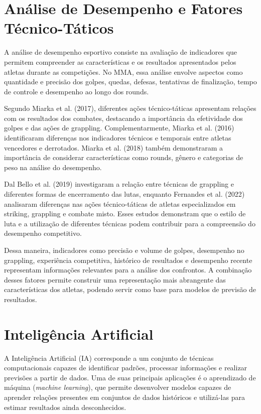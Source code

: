 \documentclass[12pt,a4paper]{report}
\begin{document}
\section{Análise de Desempenho e Fatores Técnico-Táticos}

A análise de desempenho esportivo consiste na avaliação de indicadores que permitem compreender as características e os resultados apresentados pelos atletas durante as competições. No MMA, essa análise envolve aspectos como quantidade e precisão dos golpes, quedas, defesas, tentativas de finalização, tempo de controle e desempenho ao longo dos rounds.

Segundo Miarka et al. (2017), diferentes ações técnico-táticas apresentam relações com os resultados dos combates, destacando a importância da efetividade dos golpes e das ações de grappling. Complementarmente, Miarka et al. (2016) identificaram diferenças nos indicadores técnicos e temporais entre atletas vencedores e derrotados. Miarka et al. (2018) também demonstraram a importância de considerar características como rounds, gênero e categorias de peso na análise do desempenho.

Dal Bello et al. (2019) investigaram a relação entre técnicas de grappling e diferentes formas de encerramento das lutas, enquanto Fernandes et al. (2022) analisaram diferenças nas ações técnico-táticas de atletas especializados em striking, grappling e combate misto. Esses estudos demonstram que o estilo de luta e a utilização de diferentes técnicas podem contribuir para a compreensão do desempenho competitivo.

Dessa maneira, indicadores como precisão e volume de golpes, desempenho no grappling, experiência competitiva, histórico de resultados e desempenho recente representam informações relevantes para a análise dos confrontos. A combinação desses fatores permite construir uma representação mais abrangente das características dos atletas, podendo servir como base para modelos de previsão de resultados.

\section{Inteligência Artificial}

A Inteligência Artificial (IA) corresponde a um conjunto de técnicas computacionais capazes de identificar padrões, processar informações e realizar previsões a partir de dados. Uma de suas principais aplicações é o aprendizado de máquina (\textit{machine learning}), que permite desenvolver modelos capazes de aprender relações presentes em conjuntos de dados históricos e utilizá-las para estimar resultados ainda desconhecidos.
\end{document}
